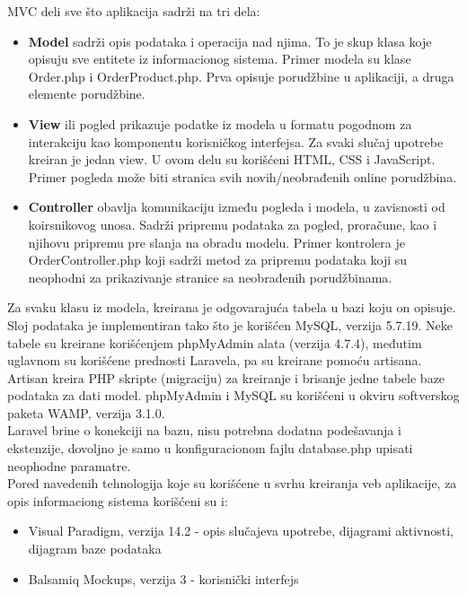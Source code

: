 \documentclass{article}
\begin{document}
MVC deli sve što aplikacija sadrži na tri dela:
\begin{itemize}
	\item \textbf{Model} sadrži opis podataka i operacija nad njima. To je skup klasa koje opisuju sve entitete iz informacionog sistema. Primer modela su klase Order.php i OrderProduct.php. Prva opisuje porudžbine u aplikaciji, a druga elemente porudžbine.
	\item \textbf{View} ili pogled prikazuje podatke iz modela u formatu pogodnom za interakciju kao komponentu korisničkog interfejsa. Za svaki slučaj upotrebe kreiran je jedan view. U ovom delu su korišćeni HTML, CSS i JavaScript. Primer pogleda može biti stranica svih novih/neobrađenih online porudžbina.
	\item \textbf{Controller} obavlja komunikaciju između pogleda i modela, u zavisnosti od koirsnikovog unosa. Sadrži pripremu podataka za pogled, proračune, kao i njihovu pripremu pre slanja na obradu modelu. Primer kontrolera je OrderController.php koji sadrži metod za pripremu podataka koji su neophodni za prikazivanje stranice sa neobrađenih porudžbinama.
\end{itemize}

Za svaku klasu iz modela, kreirana je odgovarajuća tabela u bazi koju on opisuje. Sloj podataka je implementiran tako što je korišćen MySQL, verzija 5.7.19. Neke tabele su kreirane korišćenjem phpMyAdmin alata (verzija 4.7.4), međutim uglavnom su korišćene prednosti Laravela, pa su kreirane pomoću artisana. Artisan kreira PHP skripte (migraciju) za kreiranje i brisanje jedne tabele baze podataka za dati model. phpMyAdmin i MySQL su korišćeni u okviru softverskog paketa WAMP, verzija 3.1.0.\\

Laravel brine o konekciji na bazu, nisu potrebna dodatna podešavanja i ekstenzije, dovoljno je samo u konfiguracionom fajlu database.php upisati neophodne paramatre. \\

Pored navedenih tehnologija koje su korišćene u svrhu kreiranja veb aplikacije, za opis informaciong sistema korišćeni su i:
\begin{itemize}
	\item Visual Paradigm, verzija 14.2 - opis slučajeva upotrebe, dijagrami aktivnosti, dijagram baze podataka
	\item Balsamiq Mockups, verzija 3 - korisnički interfejs
\end{itemize}
\end{document}
